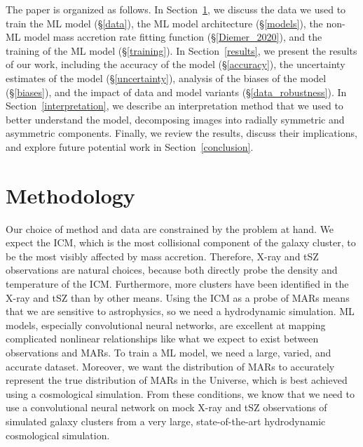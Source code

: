 \documentclass[twocolumn, linenumbers, 11pt]{aastex63}%
\begin{document}
The paper is organized as follows. In Section~\ref{methods}, we discuss the data we used to train the ML model (\S\ref{data}), the ML model architecture (\S\ref{models}), the non-ML model mass accretion rate fitting function (\S\ref{Diemer_2020}), and the training of the ML model (\S\ref{training}). In Section~\ref{results}, we present the results of our work, including the accuracy of the model (\S\ref{accuracy}), the uncertainty estimates of the model (\S\ref{uncertainty}), analysis of the biases of the model (\S\ref{biases}), and the impact of data and model variants (\S\ref{data_robustness}). In Section~\ref{interpretation}, we describe an interpretation method that we used to better understand the model, decomposing images into radially symmetric and asymmetric components. Finally, we review the results, discuss their implications, and explore future potential work in Section~\ref{conclusion}.

\section{Methodology}\label{methods}
Our choice of method and data are constrained by the problem at hand. We expect the ICM, which is the most collisional component of the galaxy cluster, to be the most visibly affected by mass accretion. Therefore, X-ray and tSZ observations are natural choices, because both directly probe the density and temperature of the ICM. Furthermore, more clusters have been identified in the X-ray and tSZ than by other means. Using the ICM as a probe of MARs means that we are sensitive to astrophysics, so we need a hydrodynamic simulation. ML models, especially convolutional neural networks, are excellent at mapping complicated nonlinear relationships like what we expect to exist between observations and MARs. To train a ML model, we need a large, varied, and accurate dataset. Moreover, we want the distribution of MARs to accurately represent the true distribution of MARs in the Universe, which is best achieved using a cosmological simulation. From these conditions, we know that we need to use a convolutional neural network on mock X-ray and tSZ observations of simulated galaxy clusters from a very large, state-of-the-art hydrodynamic cosmological simulation.
\end{document}
